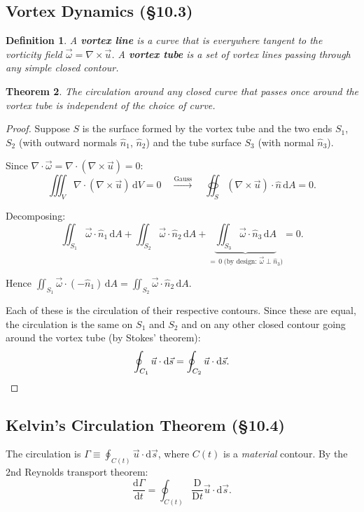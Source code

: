 \documentclass[11pt,a4paper]{article}
\newtheorem{theorem}{Theorem}[section]
\newtheorem{definition}[theorem]{Definition}
\newcommand{\D}{\mathrm{D}}
\newcommand{\Dt}{\frac{\D}{\D t}}
\newcommand{\uv}{\vec{u}}
\newcommand{\nhat}{\hat{n}}
\newcommand{\omv}{\vec{\omega}}
\begin{document}
\subsection{Vortex Dynamics (\S10.3)}

\begin{definition}
A \textbf{vortex line} is a curve that is everywhere tangent to the vorticity field $\omv = \nabla\times\uv$. A \textbf{vortex tube} is a set of vortex lines passing through any simple closed contour.
\end{definition}

\begin{theorem}
The circulation around any closed curve that passes once around the vortex tube is independent of the choice of curve.
\end{theorem}

\begin{proof}
Suppose $S$ is the surface formed by the vortex tube and the two ends $S_1$, $S_2$ (with outward normals $\hat{n}_1$, $\hat{n}_2$) and the tube surface $S_3$ (with normal $\hat{n}_3$).

Since $\nabla\cdot\omv = \nabla\cdot(\nabla\times\uv) = 0$:
\[
    \iiint_V \nabla\cdot(\nabla\times\uv)\,\mathrm{d}V = 0
    \quad \xrightarrow{\text{Gauss}} \quad
    \oiint_S (\nabla\times\uv)\cdot\nhat\,\mathrm{d}A = 0.
\]

Decomposing:
\[
    \iint_{S_1} \omv\cdot\hat{n}_1\,\mathrm{d}A + \iint_{S_2} \omv\cdot\hat{n}_2\,\mathrm{d}A + \underbrace{\iint_{S_3} \omv\cdot\hat{n}_3\,\mathrm{d}A}_{=\,0\;\text{(by design: $\omv \perp \hat{n}_3$)}} = 0.
\]

Hence $\iint_{S_1} \omv\cdot(-\hat{n}_1)\,\mathrm{d}A = \iint_{S_2} \omv\cdot\hat{n}_2\,\mathrm{d}A$.

Each of these is the circulation of their respective contours. Since these are equal, the circulation is the same on $S_1$ and $S_2$ and on any other closed contour going around the vortex tube (by Stokes' theorem):
\[
    \oint_{C_1} \uv\cdot\mathrm{d}\vec{s} = \oint_{C_2} \uv\cdot\mathrm{d}\vec{s}. \qedhere
\]
\end{proof}

\subsection{Kelvin's Circulation Theorem (\S10.4)}

The circulation is $\Gamma \equiv \oint_{C(t)} \uv\cdot\mathrm{d}\vec{s}$, where $C(t)$ is a \emph{material} contour. By the 2nd Reynolds transport theorem:
\[
    \frac{\mathrm{d}\Gamma}{\mathrm{d}t} = \oint_{C(t)} \Dt\uv \cdot \mathrm{d}\vec{s}.
\]
\end{document}
